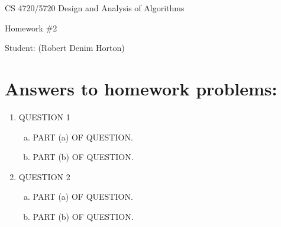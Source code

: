 \documentclass[11pt]{article}
\begin{document}
 

\rhead{\today}

\begin{center}\begin{Large}
CS 4720/5720 Design and Analysis of Algorithms

Homework \#2

Student: (Robert Denim Horton)
\end{Large}
\end{center}


\section*{Answers to homework problems:}

\begin{enumerate}
\item QUESTION 1
	\begin{enumerate}[(a)]
		\item PART (a) OF QUESTION.
		\item PART (b) OF QUESTION.
	\end{enumerate}
\item QUESTION 2
	\begin{enumerate}[(a)]
		\item PART (a) OF QUESTION.
		\item PART (b) OF QUESTION.
	\end{enumerate}
\end{enumerate}
\end{document}

